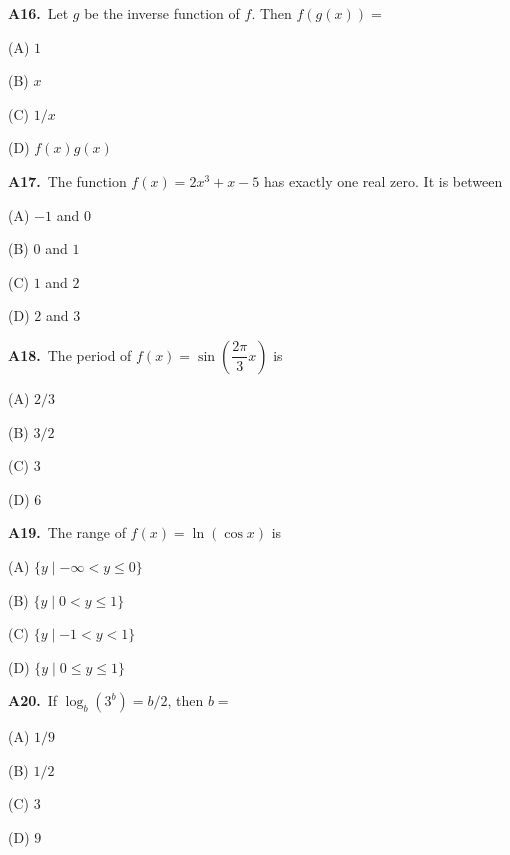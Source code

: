 \documentclass[11pt]{article}
\begin{document}
\bigskip\noindent\textbf{A16.}\ Let $g$ be the inverse function of $f$. Then $f(g(x))=$
\begin{list}{}{\setlength{\leftmargin}{3em}\setlength{\labelwidth}{2.5em}\setlength{\itemsep}{0pt}\setlength{\topsep}{2pt}}
\item[(A)] $1$
\item[(B)] $x$
\item[(C)] $1/x$
\item[(D)] $f(x)g(x)$
\end{list}

\bigskip\noindent\textbf{A17.}\ The function $f(x)=2x^3+x-5$ has exactly one real zero. It is between
\begin{list}{}{\setlength{\leftmargin}{3em}\setlength{\labelwidth}{2.5em}\setlength{\itemsep}{0pt}\setlength{\topsep}{2pt}}
\item[(A)] $-1$ and $0$
\item[(B)] $0$ and $1$
\item[(C)] $1$ and $2$
\item[(D)] $2$ and $3$
\end{list}

\bigskip\noindent\textbf{A18.}\ The period of $f(x)=\sin\left(\dfrac{2\pi}{3}x\right)$ is
\begin{list}{}{\setlength{\leftmargin}{3em}\setlength{\labelwidth}{2.5em}\setlength{\itemsep}{0pt}\setlength{\topsep}{2pt}}
\item[(A)] $2/3$
\item[(B)] $3/2$
\item[(C)] $3$
\item[(D)] $6$
\end{list}

\bigskip\noindent\textbf{A19.}\ The range of $f(x)=\ln(\cos x)$ is
\begin{list}{}{\setlength{\leftmargin}{3em}\setlength{\labelwidth}{2.5em}\setlength{\itemsep}{0pt}\setlength{\topsep}{2pt}}
\item[(A)] $\{y\mid-\infty<y\le0\}$
\item[(B)] $\{y\mid0<y\le1\}$
\item[(C)] $\{y\mid-1<y<1\}$
\item[(D)] $\{y\mid0\le y\le1\}$
\end{list}

\bigskip\noindent\textbf{A20.}\ If $\log_b(3^b)=b/2$, then $b=$
\begin{list}{}{\setlength{\leftmargin}{3em}\setlength{\labelwidth}{2.5em}\setlength{\itemsep}{0pt}\setlength{\topsep}{2pt}}
\item[(A)] $1/9$
\item[(B)] $1/2$
\item[(C)] $3$
\item[(D)] $9$
\end{list}
\end{document}
